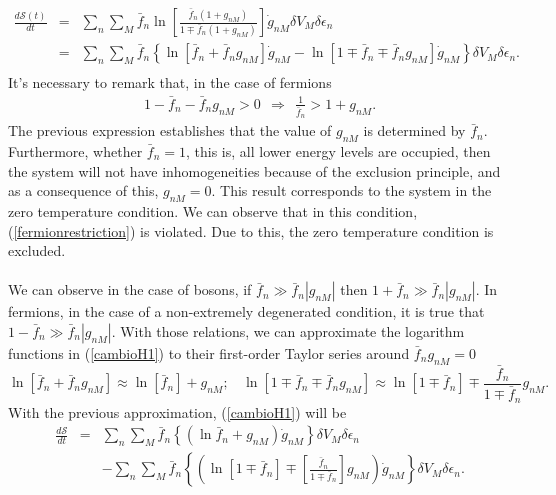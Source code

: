 \documentclass{article}
\newcommand{\de}{\delta}
\newcommand{\Ss}{\mathcal{S}}
\begin{document}
\begin{eqnarray}
    \frac{d\Ss (t)}{dt}&=&\sum_n \sum_M \bar{f}_{n}\ln \left[ \frac{\bar{f}_{n}(1+g_{nM})}{1\mp \bar{f}_{n} (1+ g_{nM})} \right]\dot{g}_{nM} \de V_M\delta \epsilon_n \nonumber \\
    &=&\sum_n \sum_M \bar{f}_n \left \{ \ln [\bar{f}_n+\bar{f}_n g_{nM}]\dot{g}_{nM}-\ln [1\mp\bar{f}_n\mp\bar{f}_n g_{nM}]\dot{g}_{nM}  \right \}\de V_M \delta \epsilon_n.\nonumber \\
    \label{cambioH1}
\end{eqnarray}{}
It's necessary to remark that, in the case of fermions
\begin{eqnarray}
   1-\bar f_n -\bar f_n g_{nM}>0 \ \ \Rightarrow \ \ \frac{1}{\bar f_n}>1+g_{nM}. \label{fermionrestriction}
\end{eqnarray}{}
The previous expression establishes that the value of $g_{nM}$ is determined by $\bar f_n$. Furthermore, whether $\bar f_{n}=1$, this is, all lower energy levels are occupied, then the system will not have inhomogeneities because of the exclusion principle, and as a consequence of this,  $g_{nM}=0$. This result corresponds to the system in the zero temperature condition. We can observe that in this condition, (\ref{fermionrestriction}) is violated. Due to this, the zero temperature condition is excluded.\\
\\
We can observe in the case of bosons, if $\bar{f}_n \gg \bar{f}_n |g_{nM}|$ then $1+\bar{f}_n \gg \bar{f}_n |g_{nM}|$. In fermions, in the case of a non-extremely degenerated condition, it is true that $1-\bar{f}_n \gg \bar{f}_n |g_{nM}|$. With those relations, we can approximate the logarithm functions in (\ref{cambioH1}) to their first-order Taylor series around $\bar f_n g_{nM}=0$ 
\begin{equation}
    \ln [\bar{f}_n+\bar{f}_n g_{nM}] \approx \ln [\bar{f}_n]+ g_{nM}; \ \ \ \ \ln[1\mp\bar{f}_n\mp\bar{f}_n g_{nM}] \approx \ln[1\mp\bar{f}_n]\mp\frac{\bar{f}_n}{1\mp\bar{f}_{n}} g_{nM}. \label{lnapproximation}
\end{equation}{}
With the previous approximation, (\ref{cambioH1}) will be
\begin{eqnarray}
    \frac{d\Ss}{dt}&=&\sum_n \sum_M \bar{f}_n\left \{ (\ln \bar{f}_n+ g_{nM})\dot{g}_{nM}\right\} \de V_M \delta \epsilon_n \nonumber \\
    &&-\sum_{n}\sum_{M}\bar f_n\left\{ \left( \ln[1\mp\bar{f}_n]\mp \left[\frac{\bar{f}_n}{1\mp\bar{f}_n} \right] g_{nM}\right)\dot{g}_{nM} \right \}\de V_M \delta \epsilon_n.\label{cambioH2}
\end{eqnarray}{}
\end{document}

